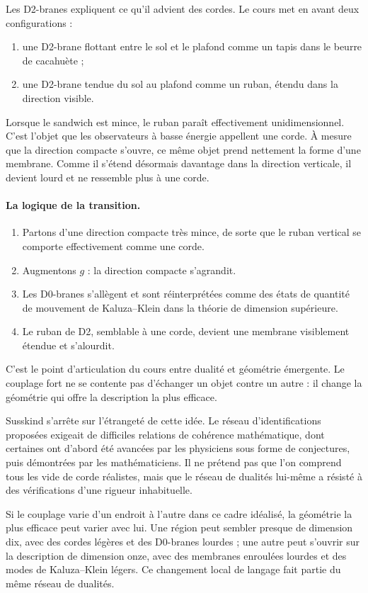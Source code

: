 Les D2-branes expliquent ce qu’il advient des cordes. Le cours met en avant deux configurations :
\begin{enumerate}
\item une D2-brane flottant entre le sol et le plafond comme un tapis dans le beurre de cacahuète ;
\item une D2-brane tendue du sol au plafond comme un ruban, étendu dans la direction visible.
\end{enumerate}
Lorsque le sandwich est mince, le ruban paraît effectivement unidimensionnel. C’est l’objet que les observateurs à basse énergie appellent une corde. À mesure que la direction compacte s’ouvre, ce même objet prend nettement la forme d’une membrane. Comme il s’étend désormais davantage dans la direction verticale, il devient lourd et ne ressemble plus à une corde.

\paragraph{La logique de la transition.}
\begin{enumerate}
\item Partons d’une direction compacte très mince, de sorte que le ruban vertical se comporte effectivement comme une corde.
\item Augmentons \(g\) : la direction compacte s’agrandit.
\item Les D0-branes s’allègent et sont réinterprétées comme des états de quantité de mouvement de Kaluza--Klein dans la théorie de dimension supérieure.
\item Le ruban de D2, semblable à une corde, devient une membrane visiblement étendue et s’alourdit.
\end{enumerate}
C’est le point d’articulation du cours entre dualité et géométrie émergente. Le couplage fort ne se contente pas d’échanger un objet contre un autre : il change la géométrie qui offre la description la plus efficace.

Susskind s’arrête sur l’étrangeté de cette idée. Le réseau d’identifications proposées exigeait de difficiles relations de cohérence mathématique, dont certaines ont d’abord été avancées par les physiciens sous forme de conjectures, puis démontrées par les mathématiciens. Il ne prétend pas que l’on comprend tous les vide de corde réalistes, mais que le réseau de dualités lui-même a résisté à des vérifications d’une rigueur inhabituelle.

Si le couplage varie d’un endroit à l’autre dans ce cadre idéalisé, la géométrie la plus efficace peut varier avec lui. Une région peut sembler presque de dimension dix, avec des cordes légères et des D0-branes lourdes ; une autre peut s’ouvrir sur la description de dimension onze, avec des membranes enroulées lourdes et des modes de Kaluza--Klein légers. Ce changement local de langage fait partie du même réseau de dualités.

